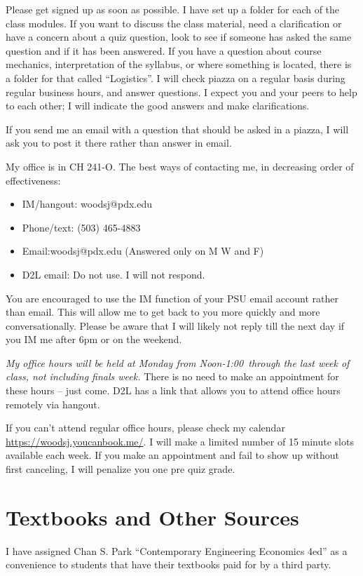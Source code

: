 \documentclass[letterpaper,10pt]{article}
\newcommand{\Office}{at Monday from Noon-1:00}
\begin{document}
Please get signed up as soon as possible. I have set up a
folder for each of the class modules. If you want to discuss the class material, need a clarification or have a concern about a quiz question, look to see if someone has asked the same question and if it has been answered. 
If you have a question about course mechanics, interpretation of the
syllabus, or where something is located, there is a folder for
that called ``Logistics''. I will check piazza on a regular basis during regular business hours, and answer questions. I expect you and your peers to help to each other; I will indicate the good answers and make clarifications.  

If you send me an email with a question that should be asked in a piazza, I
will ask you to post it there rather than answer in email.

My office is in CH 241-O.  The best ways of contacting me, in
decreasing order of effectiveness:
\begin{itemize}
\item IM/hangout: woodsj@pdx.edu
\item Phone/text: (503) 465-4883
\item Email:woodsj@pdx.edu (Answered only on M W and F)
\item D2L email: Do not use.  I will not respond.
\end{itemize}

You are encouraged to use the IM function of your PSU email account rather than email. This will allow me to get back to you more quickly and more conversationally. Please be aware that I will likely not reply till the next day if you IM me after 6pm or on the weekend.  

\emph{My office hours will be held \Office ~through the last week of class, not including finals week.} There is no need to make an appointment for these hours -- just come.  D2L has a link that allows you to attend office hours remotely via hangout.


If you can’t attend regular office hours, please check my calendar \url{https://woodsj.youcanbook.me/}. I will make a limited number of 15 minute slots available each week. If you make an appointment and fail to show up without first canceling, I will penalize you one pre quiz grade.  


 
\section{Textbooks and Other Sources}
I have assigned Chan S. Park ``Contemporary Engineering Economics
4ed'' as a convenience to students that have their textbooks paid for by a third party. 
\end{document}
